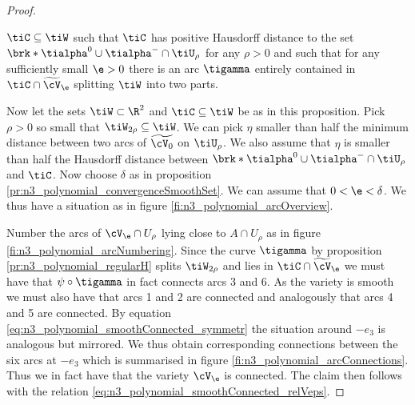 \begin{proof}
\begin{proposition}
    $\tiC\subseteq \tiW$ such that $\tiC$ has positive Hausdorff distance to the set
    $\brk*{\tialpha^0\cup\tialpha^-}\cap \tiU_\rho$ for any $\rho>0$
    and such that for any sufficiently small $\e>0$ there is an arc $\tigamma$
    entirely contained in $\tiC\cap\widetilde{\cV}_\e$ splitting $\tiW$ into two parts.
  \end{proposition}
  Now let the sets $\tiW\subset\R^2$ and $\tiC\subseteq \tiW$ be as in this proposition.
  Pick $\rho>0$ so small that $\tiW_{2\rho}\subseteq \tiW$. 
  We can pick $\eta$ smaller than half the minimum distance between two arcs of $\widetilde{\cV_0}$ on $\tiU_{\rho}$.
  We also assume that $\eta$ is smaller than half the Hausdorff distance between $\brk*{\tialpha^0\cup\tialpha^-}\cap\tiU_\rho$
  and $\tiC$.
  Now choose $\delta$ as in proposition \ref{pr:n3_polynomial_convergenceSmoothSet}. We can assume that $0<\e<\delta$.
  We thus have a situation as in figure \ref{fi:n3_polynomial_arcOverview}.
  
  Number the arcs of $\cV_\e\cap U_\rho$ lying close to $A\cap U_\rho$ as in figure \ref{fi:n3_polynomial_arcNumbering}.
  Since the curve $\tigamma$ by proposition \ref{pr:n3_polynomial_regularH} splits $\tiW_{2\rho}$ and lies in $\tiC\cap\widetilde{\cV}_\e$ we must have that
  $\psi\circ\tigamma$ in fact connects arcs 3 and 6.
  As the variety is smooth we must also have that arcs 1 and 2 are connected
  and analogously that arcs 4 and 5 are connected.
  By equation \eqref{eq:n3_polynomial_smoothConnected_symmetr} the situation around $-e_3$ is analogous but mirrored.
  We thus obtain corresponding connections between the six arcs at $-e_3$ which is summarised in figure \ref{fi:n3_polynomial_arcConnections}.
  Thus we in fact have that the variety $\cV_\e$ is connected.
  The claim then follows with the relation \eqref{eq:n3_polynomial_smoothConnected_relVeps}.
\end{proof}

